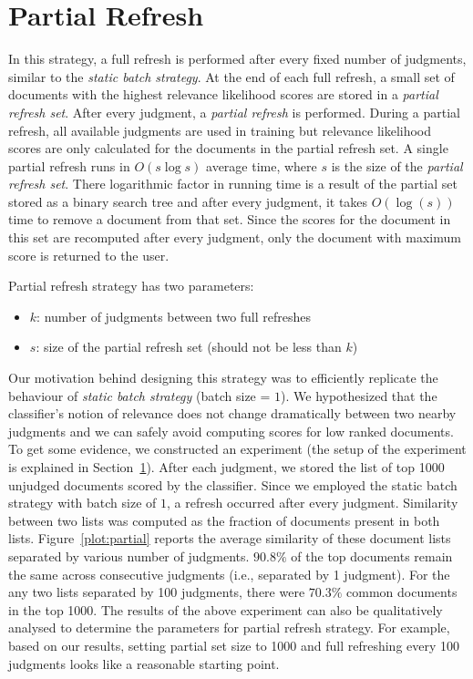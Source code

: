 \section{Partial Refresh}

In this strategy, a full refresh is performed after every fixed number of
judgments, similar to the \textit{static batch strategy}. At the end of each
full refresh, a small set of documents with the highest relevance likelihood
scores are stored in a \textit{partial refresh set}. After every judgment, a
\textit{partial refresh} is performed. During a partial refresh, all available
judgments are used in training but relevance likelihood scores are only
calculated for the documents in the partial refresh set. A single partial
refresh runs in $O(s\log{s})$ average time, where $s$ is the size of the
\textit{partial refresh set}. There logarithmic factor in running time
is a result of the partial set stored as a binary search tree and after every
judgment, it takes $O(\log(s))$ time to remove a document from that set. Since
the scores for the document in this set are recomputed after every
judgment, only the document with maximum score is returned to the user.

Partial refresh strategy has two parameters:
\begin{itemize}
    \item $k$: number of judgments between two full refreshes
    \item $s$: size of the partial refresh set (should not be less than $k$)
\end{itemize}

Our motivation behind designing this strategy was to efficiently replicate the
behaviour of \textit{static batch strategy} (batch size = $1$). We hypothesized
that the classifier's notion of relevance does not change dramatically between
two nearby judgments and we can safely avoid computing scores for low ranked
documents. To get some evidence, we constructed an experiment (the setup of the
experiment is explained in Section~\ref{}). After each judgment, we stored the
list of top 1000 unjudged documents scored by the classifier. Since we employed
the static batch strategy with batch size of $1$, a refresh occurred after every
judgment. Similarity between two lists was computed as the fraction of documents
present in both lists.  Figure~\ref{plot:partial} reports the average similarity
of these document lists separated by various number of judgments. $90.8\%$ of
the top documents remain the same across consecutive judgments (i.e., separated
by 1 judgment). For the any two lists separated by 100 judgments, there were
$70.3\%$ common documents in the top 1000.  The results of the above experiment
can also be qualitatively analysed to determine the parameters for partial
refresh strategy. For example, based on our results, setting partial set size to
1000 and full refreshing every 100 judgments looks like a reasonable starting
point.


